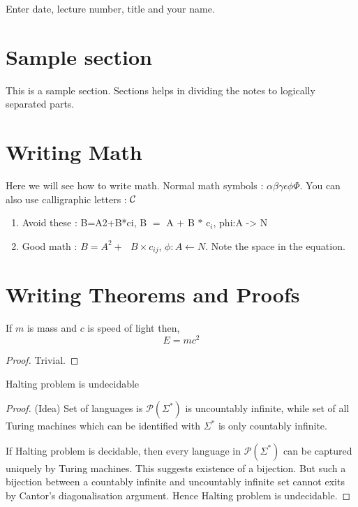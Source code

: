 
\begin{note}
	Enter date, lecture number, title and your name. 
\end{note}

\section{Sample section}
This is a sample section. Sections helps in dividing the notes to logically separated parts.


\section{Writing Math}
Here we will see how to write math. Normal math symbols : 
$\alpha\beta\gamma\epsilon\phi\Phi $. You can also use calligraphic letters : ${\cal C}$
\begin{enumerate}
\item Avoid these : B=A2+B*ci, B $=$ A $+$ B $*$ c$_i$, phi:A -> N
\item Good math : $B=A^2 +~~~B \times c_{ij}$, $\phi: A \leftarrow N$. Note the space in the equation.
\end{enumerate}



\section{Writing Theorems and Proofs} \label{sec:rel}
\begin{theorem} \label{cl:relativity}
If $m$ is mass and $c$ is speed of light then, 
\begin{equation} \label{eq:relativity}
E = mc^2
\end{equation}

\end{theorem}
\begin{proof}
Trivial. 
\end{proof}

\begin{claim} 
Halting problem is undecidable
\end{claim}
\begin{proof}(Idea)
Set of languages is $\mathcal{P}(\Sigma^*)$ is uncountably infinite,
while set of all Turing machines which can be identified with 
$\Sigma^*$ is only countably infinite. 

If Halting problem is 
decidable, then every language in $\mathcal{P}(\Sigma^*)$ can be 
captured uniquely by Turing machines. This suggests existence of a 
bijection. But such a bijection between a countably infinite 
and uncountably infinite set cannot exits by Cantor's diagonalisation argument. 
Hence Halting problem is undecidable.
\end{proof}

